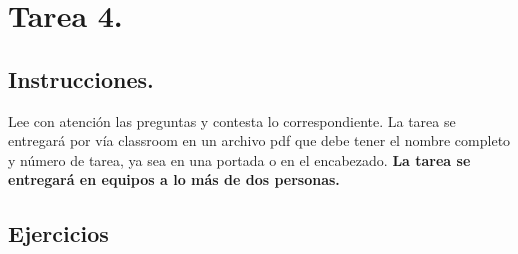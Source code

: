\documentclass[12pt]{article}
\begin{document}

{\color{blue} \section*{Tarea 4.}}

{\color{blue} \subsection*{Instrucciones.}}
\vspace{0.5em} 

Lee con atención las preguntas y contesta lo correspondiente. La tarea se entregará por vía classroom
en un archivo pdf que debe tener el nombre completo y número de tarea, ya sea en una portada o en el encabezado.
\textbf{La tarea se entregará en equipos a lo más de dos personas.}\\

{\color{blue} \subsection*{Ejercicios}}
\vspace{0.5em}
\end{document}
